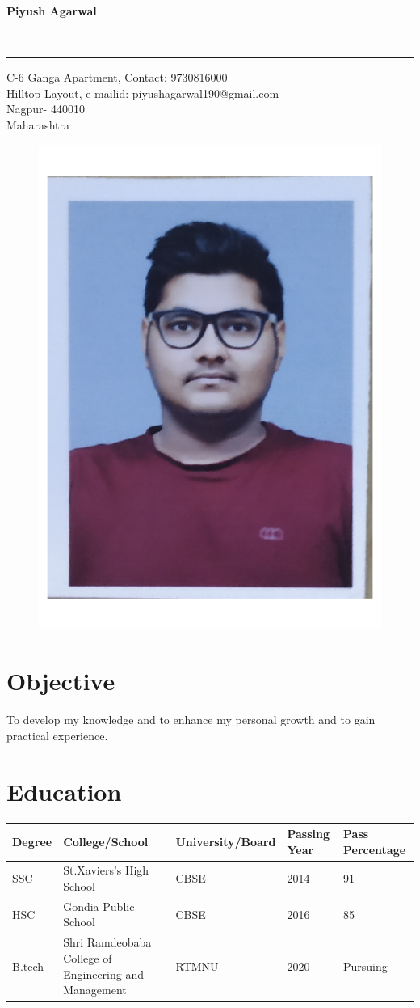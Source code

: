 \documentclass{article}
\begin{document}
	
{\begin{center}
		
	\end{center}\Huge\textbf{Piyush Agarwal}}
\\
\rule{\paperwidth}{0.2ex}
C-6 Ganga Apartment,\hspace{24ex} Contact: 9730816000
\\
Hilltop Layout, \hspace{32ex} e-mailid: piyushagarwal190@gmail.com
\\
Nagpur- 440010 
\\
Maharashtra
\begin{flushright}
	\begin{figure}[h]
		\includegraphics[width=15ex]{PIYUSH7}
	\end{figure}
\end{flushright}
\section{Objective}
{\large To develop my knowledge and to enhance my personal growth and to gain practical experience.}
\section{Education}
\begin{tabular}{ |p{3cm}|p{3cm}|p{3cm}|p{2cm}|p{3cm}| }
	\hline
	Degree& College/School &University/Board &Passing Year &Pass Percentage 
	\\
	\hline
	\hline
	SSC & St.Xaviers's High School &CBSE &2014 &91 \\
	\hline
	HSC & Gondia Public School   & CBSE &2016 &85 \\
	\hline
	B.tech &Shri Ramdeobaba College of Engineering and Management & RTMNU &2020 &Pursuing \\
	\hline
\end{tabular}
\end{document}
